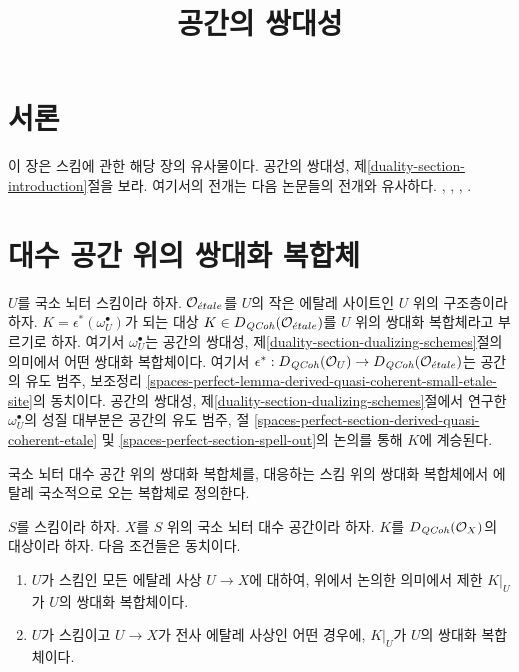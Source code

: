 

%


\title{공간의 쌍대성}


\maketitle

\label{section-phantom}

\tableofcontents

\section{서론}
\label{section-introduction}

\noindent
이 장은 스킴에 관한 해당 장의 유사물이다. 공간의 쌍대성,
제\ref{duality-section-introduction}절을 보라.
여기서의 전개는 다음 논문들의 전개와 유사하다.
\cite{Neeman-Grothendieck}, \cite{LN},
\cite{Lipman-notes}, \cite{Neeman-improvement}.




\section{대수 공간 위의 쌍대화 복합체}
\label{section-dualizing-spaces}

\noindent
$U$를 국소 뇌터 스킴이라 하자. $\mathcal{O}_{\acute{e}tale}$를
$U$의 작은 에탈레 사이트인 $U$ 위의 구조층이라 하자.
$K = \epsilon^*(\omega_U^\bullet)$가 되는 대상
$K \in D_{\mathit{QCoh}}(\mathcal{O}_{\acute{e}tale})$를 $U$ 위의 쌍대화 복합체라고
부르기로 하자. 여기서 $\omega_U^\bullet$는
공간의 쌍대성, 제\ref{duality-section-dualizing-schemes}절의 의미에서
어떤 쌍대화 복합체이다.
여기서 $\epsilon^* : D_{\mathit{QCoh}}(\mathcal{O}_U) \to D_{\mathit{QCoh}}(\mathcal{O}_{\acute{e}tale})$는
공간의 유도 범주, 보조정리
\ref{spaces-perfect-lemma-derived-quasi-coherent-small-etale-site}의 동치이다.
공간의 쌍대성, 제\ref{duality-section-dualizing-schemes}절에서 연구한
$\omega_U^\bullet$의 성질 대부분은
공간의 유도 범주, 절
\ref{spaces-perfect-section-derived-quasi-coherent-etale} 및
\ref{spaces-perfect-section-spell-out}의 논의를 통해 $K$에 계승된다.

\medskip\noindent
국소 뇌터 대수 공간 위의 쌍대화 복합체를, 대응하는 스킴 위의
쌍대화 복합체에서 에탈레 국소적으로 오는 복합체로 정의한다.

\begin{lemma}
\label{lemma-equivalent-definitions}
$S$를 스킴이라 하자. $X$를 $S$ 위의 국소 뇌터 대수 공간이라 하자.
$K$를 $D_{\mathit{QCoh}}(\mathcal{O}_X)$의 대상이라 하자. 다음 조건들은 동치이다.
\begin{enumerate}
\item $U$가 스킴인 모든 에탈레 사상 $U \to X$에 대하여,
위에서 논의한 의미에서 제한 $K|_U$가 $U$의 쌍대화 복합체이다.
\item $U$가 스킴이고 $U \to X$가 전사 에탈레 사상인 어떤 경우에,
$K|_U$가 $U$의 쌍대화 복합체이다.
\end{enumerate}
\end{lemma}

